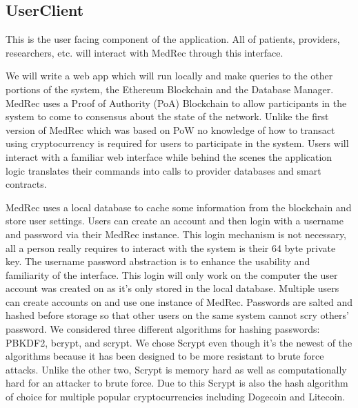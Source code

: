 \documentclass[a4paper]{article}
\begin{document}
\subsection{UserClient}

This is the user facing component of the application. All of patients, providers, researchers, etc. will interact with MedRec through this interface.

We will write a web app which will run locally and make queries to the other portions of the system, the Ethereum Blockchain and the Database Manager. MedRec uses a Proof of Authority (PoA) Blockchain to allow participants in the system to come to consensus about the state of the network. Unlike the first version of MedRec which was based on PoW no knowledge of  how to transact using cryptocurrency is required for users to participate in the system. Users will interact with a familiar web interface while behind the scenes the application logic translates their commands into calls to provider databases and smart contracts.

    MedRec uses a local database to cache some information from the blockchain and store user settings. Users can create an account and then login with a username and password via their MedRec instance. This login mechanism is not necessary, all a person really requires to interact with the system is their 64 byte private key. The username password abstraction is to enhance the usability and familiarity of the interface. This login will only work on the computer the user account was created on as it's only stored in the local database. Multiple users can create accounts on and use one instance of MedRec. Passwords are salted and hashed before storage so that other users on the same system cannot scry others' password. We considered three different algorithms for hashing passwords: PBKDF2, bcrypt, and scrypt. We chose Scrypt even though it's the newest of the algorithms because it has been designed to be more resistant to brute force attacks. Unlike the other two, Scrypt is memory hard as well as computationally hard for an attacker to brute force. Due to this Scrypt is also the hash algorithm of choice for multiple popular cryptocurrencies including Dogecoin and Litecoin.
\end{document}
